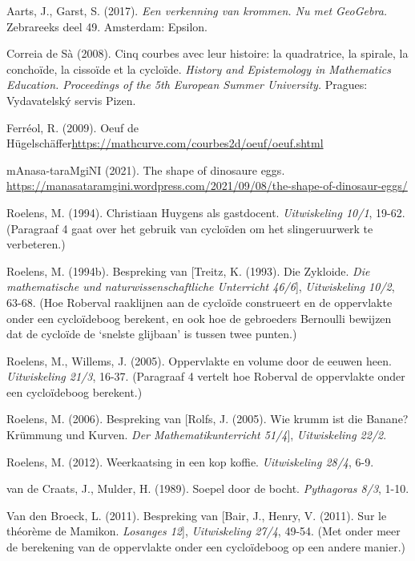 \begin{bronnen}
\item Aarts, J., Garst, S. (2017). \emph{Een verkenning van krommen. Nu met GeoGebra.} Zebrareeks deel 49. Amsterdam: Epsilon.

\item Correia de Sà (2008). Cinq courbes avec leur histoire: la quadratrice, la spirale, la conchoïde, la cissoïde et la cycloïde. \emph{History and Epistemology in Mathematics Education. Proceedings of the 5th European Summer University.} Pragues: Vydavatelský servis Pizen.

\item Ferréol, R. (2009). Oeuf de Hügelschäffer\url{https://mathcurve.com/courbes2d/oeuf/oeuf.shtml}

\item mAnasa-taraMgiNI (2021). The shape of dinosaure eggs. \url{https://manasataramgini.wordpress.com/2021/09/08/the-shape-of-dinosaur-eggs/}

\item Roelens, M. (1994). Christiaan Huygens als gastdocent. \emph{Uitwiskeling 10/1}, 19-62. (Paragraaf 4 gaat over het gebruik van cycloïden om het slingeruurwerk te verbeteren.)

\item Roelens, M. (1994b). Bespreking van [Treitz, K. (1993). Die Zykloide. \emph{Die mathematische und naturwissenschaftliche Unterricht 46/6}], \emph{Uitwiskeling 10/2}, 63-68. (Hoe Roberval raaklijnen aan de cycloïde construeert en de oppervlakte onder een cycloïdeboog berekent, en ook hoe de gebroeders Bernoulli bewijzen dat de cycloïde de `snelste glijbaan' is tussen twee punten.)

\item Roelens, M., Willems, J. (2005). Oppervlakte en volume door de eeuwen heen. \emph{Uitwiskeling 21/3}, 16-37. (Paragraaf 4 vertelt hoe Roberval de oppervlakte onder een cycloïdeboog berekent.)

\item Roelens, M. (2006). Bespreking van [Rolfs, J. (2005). Wie krumm ist die Banane? Krümmung und Kurven. \emph{Der Mathematikunterricht 51/4}], \emph{Uitwiskeling 22/2}.

\item Roelens, M. (2012). Weerkaatsing in een kop koffie. \emph{Uitwiskeling 28/4}, 6-9.

\item van de Craats, J., Mulder, H. (1989). Soepel door de bocht. \emph{Pythagoras 8/3}, 1-10.

\item Van den Broeck, L. (2011). Bespreking van [Bair, J., Henry, V. (2011). Sur le théorème de Mamikon. \emph{Losanges 12}], \emph{Uitwiskeling 27/4}, 49-54. (Met onder meer de berekening van de oppervlakte onder een cycloïdeboog op een andere manier.)

\end{bronnen}